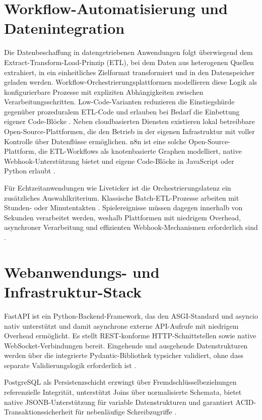 \section{Workflow-Automatisierung und Datenintegration}\label{workflow-automatisierung}

Die Datenbeschaffung in datengetriebenen Anwendungen folgt überwiegend dem Extract-Transform-Load-Prinzip (ETL), bei dem Daten aus heterogenen Quellen extrahiert, in ein einheitliches Zielformat transformiert und in den Datenspeicher geladen werden. Workflow-Orchestrierungsplattformen modellieren diese Logik als konfigurierbare Prozesse mit expliziten Abhängigkeiten zwischen Verarbeitungsschritten. Low-Code-Varianten reduzieren die Einstiegshürde gegenüber prozeduralem ETL-Code und erlauben bei Bedarf die Einbettung eigener Code-Blöcke \cite{freitas2025, venkiteela2025}. Neben cloudbasierten Diensten existieren lokal betreibbare Open-Source-Plattformen, die den Betrieb in der eigenen Infrastruktur mit voller Kontrolle über Datenflüsse ermöglichen. n8n ist eine solche Open-Source-Plattform, die ETL-Workflows als knotenbasierte Graphen modelliert, native Webhook-Unterstützung bietet und eigene Code-Blöcke in JavaScript oder Python erlaubt \cite{venkiteela2025, nakavisute2025}.

Für Echtzeitanwendungen wie Liveticker ist die Orchestrierungslatenz ein zusätzliches Auswahlkriterium. Klassische Batch-ETL-Prozesse arbeiten mit Stunden- oder Minutentakten \cite{freitas2025}. Spielereignisse müssen dagegen innerhalb von Sekunden verarbeitet werden, weshalb Plattformen mit niedrigem Overhead, asynchroner Verarbeitung und effizienten Webhook-Mechanismen erforderlich sind \cite{nakavisute2025}.


\section{Webanwendungs- und Infrastruktur-Stack}\label{backend-frontend-und-deployment-technologien}

FastAPI ist ein Python-Backend-Framework, das den ASGI-Standard und asyncio nativ unterstützt und damit asynchrone externe API-Aufrufe mit niedrigem Overhead ermöglicht. Es stellt REST-konforme HTTP-Schnittstellen sowie native WebSocket-Verbindungen bereit. Eingehende und ausgehende Datenstrukturen werden über die integrierte Pydantic-Bibliothek typsicher validiert, ohne dass separate Validierungslogik erforderlich ist \cite{fastapi}.

PostgreSQL als Persistenzschicht erzwingt über Fremdschlüsselbeziehungen referenzielle Integrität, unterstützt Joins über normalisierte Schemata, bietet native JSONB-Unterstützung für variable Datenstrukturen und garantiert ACID-Transaktionssicherheit für nebenläufige Schreibzugriffe \cite{postgresql2024}.

